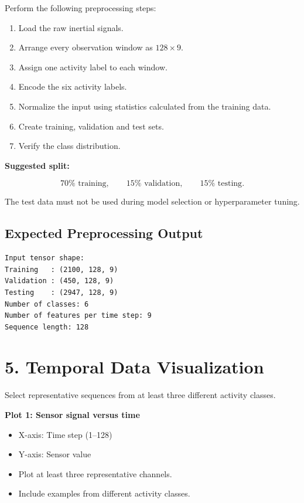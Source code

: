 \documentclass[10pt]{article}
\begin{document}
Perform the following preprocessing steps:

\begin{enumerate}
\item Load the raw inertial signals.
\item Arrange every observation window as $128\times9$.
\item Assign one activity label to each window.
\item Encode the six activity labels.
\item Normalize the input using statistics calculated from the training data.
\item Create training, validation and test sets.
\item Verify the class distribution.
\end{enumerate}

\textbf{Suggested split:}

\[
70\% \text{ training},\qquad
15\% \text{ validation},\qquad
15\% \text{ testing}.
\]

The test data must not be used during model selection or hyperparameter tuning.

\subsection*{Expected Preprocessing Output}
\begin{verbatim}
Input tensor shape:
Training   : (2100, 128, 9)
Validation : (450, 128, 9)
Testing    : (2947, 128, 9)
Number of classes: 6
Number of features per time step: 9
Sequence length: 128
\end{verbatim}
\section*{5. Temporal Data Visualization}

Select representative sequences from at least three different activity
classes.

\textbf{Plot 1: Sensor signal versus time}

\begin{itemize}
\item X-axis: Time step (1--128)
\item Y-axis: Sensor value
\item Plot at least three representative channels.
\item Include examples from different activity classes.
\end{itemize}
\end{document}
